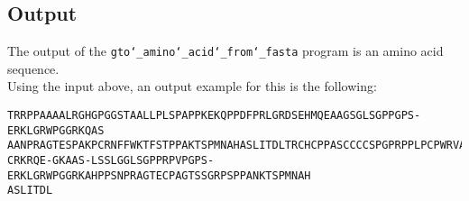 \subsection*{Output}

The output of the \texttt{gto\char`_amino\char`_acid\char`_from\char`_fasta} program is an amino acid sequence.\\
Using the input above, an output example for this is the following:
\begin{lstlisting}
TRRPPAAAALRGHGPGGSTAALLPLSPAPPKEKQPPDFPRLGRDSEHMQEAAGSGLSGPPGPS-ERKLGRWPGGRKQAS
AANPRAGTESPAKPCRNFFWKTFSTPPAKTSPMNAHASLITDLTRCHCPPASCCCCSPGPRPPLPCPWRVAPPAETASI
CRKRQE-GKAAS-LSSLGGLSGPPRPVPGPS-ERKLGRWPGGRKAHPPSNPRAGTECPAGTSSGRPSPPANKTSPMNAH
ASLITDL
\end{lstlisting}
